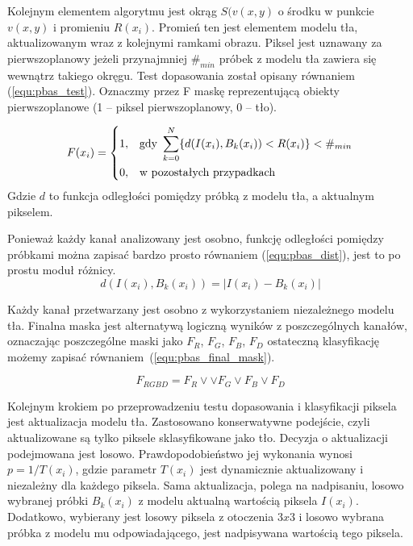 \documentclass[b5paper,10pt,twoside]{article}
\begin{document}
{Kolejnym elementem algorytmu jest okrąg $S(v(x,y)$ o środku w punkcie $v(x,y)$ i promieniu $R(x_i)$. Promień ten jest elementem modelu tła, aktualizowanym wraz z kolejnymi ramkami obrazu. Piksel jest uznawany za pierwszoplanowy jeżeli przynajmniej $\#_{min}$ próbek z modelu tła zawiera się wewnątrz takiego okręgu. Test dopasowania został opisany równaniem (\ref{equ:pbas_test}). Oznaczmy przez F maskę reprezentującą obiekty pierwszoplanowe (1 – piksel pierwszoplanowy, 0 – tło).

	\begin{equation}
	    F(x_i) = 
		\begin{dcases}
    		1, & \text{gdy } \sum_{k=0}^{N} \{ d(I(x_i), B_k(x_i)) < R(x_i) \} < \#_{min} \\
    		0, & \text{w pozostałych przypadkach} 
		\end{dcases}
	\label{equ:pbas_test}	
	\end{equation}
\noindent Gdzie $d$ to funkcja odległości pomiędzy próbką z modelu tła, a aktualnym pikselem. 

Ponieważ każdy kanał analizowany jest osobno, funkcję odległości pomiędzy próbkami można zapisać bardzo prosto równaniem (\ref{equ:pbas_dist}), jest to po prostu moduł różnicy.
	\begin{equation}
		d(I(x_i),B_k(x_i)) = | I(x_i) - B_k(x_i) |
	\label{equ:pbas_dist}	
	\end{equation}

Każdy kanał przetwarzany jest osobno z wykorzystaniem niezależnego modelu tła. Finalna maska jest alternatywą logiczną wyników z poszczególnych kanałów, oznaczając poszczególne maski jako $F_R$, $F_G$, $F_B$, $F_D$ ostateczną klasyfikację możemy zapisać równaniem~(\ref{equ:pbas_final_mask}).

    \begin{equation}
        F_{RGBD} = F_R \lor \lor F_G \lor F_B \lor F_D
    \label{equ:pbas_final_mask}
    \end{equation}

Kolejnym krokiem po przeprowadzeniu testu dopasowania i klasyfikacji piksela jest aktualizacja modelu tła. Zastosowano konserwatywne podejście, czyli aktualizowane są tylko piksele sklasyfikowane jako tło. Decyzja o aktualizacji podejmowana jest losowo. Prawdopodobieństwo jej wykonania wynosi $p = 1/T(x_i)$, gdzie parametr $T(x_i)$ jest dynamicznie aktualizowany i niezależny dla każdego piksela. Sama aktualizacja, polega na nadpisaniu, losowo wybranej próbki $B_k(x_i)$ z modelu aktualną wartością piksela $I(x_i)$. Dodatkowo, wybierany jest losowy piksela z otoczenia $3x3$ i losowo wybrana próbka z modelu mu odpowiadającego, jest nadpisywana wartością tego piksela.

}
\end{document}
